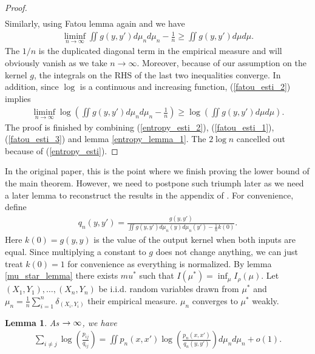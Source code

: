 \documentclass[10pt]{article}
\def\n{\noindent}
\def\n{\noindent}
\newtheorem{lemma}{\bf Lemma}
\newenvironment{Proof of lemma}{\noindent{\bf Proof of Lemma}}{\hfill$\Box$\newline}
\newenvironment{Proof of claim}{\noindent{\bf Proof of claim}}{\hfill$\Box$\newline}
\newenvironment{Proof of theorem}{\noindent{\bf Proof of Theorem}}{\hfill\scriptsize{$\Box$}\newline}
\newenvironment{Proof of theorems}{\noindent{\bf Proof of Theorems}}{\hfill$\Box$\newline}
\newenvironment{Proof of proposition}{\noindent{\bf Proof of Proposition}}{\hfill$\Box$\newline}
\newenvironment{Proof of propositions}{\noindent{\bf Proof of Propositions}}{\hfill$\Box$\newline}
\newenvironment{Proof of exercise}{\noindent{\it Proof of Exercise:}}{\hfill$\Box$}
\numberwithin{equation}{section}
\begin{document}
\begin{proof}
\begin{align}
    \end{align}
    Similarly, using Fatou lemma again and we have
    \begin{align} \label{fatou_esti_2}
        \liminf_{n \to \infty} \iint g(y,y') d\mu_n d\mu_n - \frac{1}{n} \geq \iint g(y,y')d\mu d\mu.
    \end{align}
    The $1/n$ is the duplicated diagonal term in the empirical measure and will obviously vanish as we take $n \to \infty$. Moreover, because of our assumption on the kernel $g$, the integrals on the RHS of the last two inequalities converge. In addition, since $\log$ is a continuous and increasing function, (\ref{fatou_esti_2}) implies
    \begin{align} \label{fatou_esti_3}
        \liminf_{n \to \infty} \log \left(\iint g(y,y') d\mu_n d\mu_n - \frac{1}{n}\right) \geq \log \left(\iint g(y,y')d\mu d\mu \right).
    \end{align}
    The proof is finished by combining (\ref{entropy_esti_2}), (\ref{fatou_esti_1}), (\ref{fatou_esti_3}) and lemma \ref{entropy_lemma_1}. The $2 \log n$ cancelled out because of (\ref{entropy_esti}).
\end{proof}
In the original paper, this is the point where we finish proving the lower bound of the main theorem. However, we need to postpone such triumph later as we need a later lemma to reconstruct the results in the appendix of \cite{auffinger-tsne}. For convenience, define
\begin{align}
    q_n(y,y') = \frac{g(y,y')}{\iint g(y,y')d \mu_n(y) d \mu_n (y') - \frac{1}{n}k(0)}.
\end{align}
Here $k(0) = g(y,y)$ is the value of the output kernel when both inputs are equal. Since multiplying a constant to $g$ does not change anything, we can just treat $k(0)=1$ for convenience as everything is normalized.
By lemma \ref{mu_star_lemma} there exists $mu^*$ such that $I(\mu^*) = \inf_{\mu}I_{\rho}(\mu)$. Let $(X_1,Y_1), \dots, (X_n,Y_n)$ be i.i.d. random variables drawn from $\mu^*$ and $\mu_n = \frac{1}{n} \sum_{i=1}^n \delta_{(X_i,Y_i)}$ their empirical measure. $\mu_n$ converges to $\mu^*$ weakly.
\begin{lemma} \label{int_approx_lemma_2}
    As $\n \to \infty$, we have
    \begin{align}
        \sum_{i \neq j} \log \left(\frac{p_{ij}}{q_{ij}}\right) = \iint p_n(x,x') \log \left(\frac{p_n(x,x')}{q_n(y,y')}\right) d\mu_n d\mu_n + o(1).
    \end{align}
\end{lemma}
\end{document}
